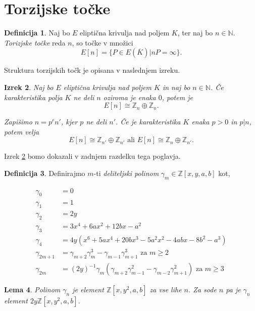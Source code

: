 \documentclass[12pt,a4paper,twoside]{article}
\theoremstyle{definition} %
\newtheorem{definicija}{Definicija}[section]
\theoremstyle{plain} %
\newtheorem{lema}[definicija]{Lema}
\newtheorem{izrek}[definicija]{Izrek}
\numberwithin{equation}{section}  %
\newcommand{\N}{\mathbb N}
\newcommand{\Z}{\mathbb Z}
\newcommand{\E}[1]{E({#1})}
\begin{document}
\section{Torzijske točke}

\begin{definicija}
Naj bo $E$ eliptična krivulja nad poljem $K$, ter naj bo $n\in \N$. \emph{Torizjske točke} reda $n$, so točke v množici
$$E[n] = \{ P \in \E{\overline{K}} | nP = \infty \}.$$
\end{definicija}

Struktura torzijskih točk je opisana v naslednjem izreku.

\begin{izrek}
\label{IzrekTor}
Naj bo $E$ eliptična krivulja nad poljem $K$ in naj bo $n \in \N$. Če karakteristika polja $K$ ne deli $n$ oziroma je enaka $0$, potem je
$$E[n] \cong \mathbb{Z}_n \oplus \mathbb{Z}_n.$$

Zapišimo $n=p^rn'$, kjer $p$ ne deli $n'$. Če je karakteristika $K$ enaka $p >0$ in $p|n$, potem velja
$$E[n] \cong \mathbb{Z}_{n'} \oplus \mathbb{Z}_{n'} \text{ ali } E[n] \cong \mathbb{Z}_n \oplus \mathbb{Z}_{n'}.$$

\end{izrek}

Izrek \ref{IzrekTor} bomo dokazali v zadnjem razdelku tega poglavja.

\begin{definicija}
Definirajmo $m$-ti \emph{deliteljski polinom} $\gamma_m \in \Z[x,y,a,b]$ kot,


\begin{align}
\gamma_0 &{}= 0  \nonumber \\
\gamma_1 &{}= 1  \nonumber \\
\gamma_2 &{}= 2y  \nonumber \\
\gamma_3 &{}= 3x^4 + 6ax^2 + 12bx-a^2 \nonumber \\
\gamma_4 &{}= 4y(x^6+5ax^4+20bx^3-5a^2x^2-4abx-8b^2-a^3) \nonumber \\
\gamma_{2m+1} &{}= \gamma_{m+2}\gamma_{m}^3-\gamma_{m-1}\gamma_{m+1}^3 \text{ za } m \geq 2 \nonumber \\
\gamma_{2m} &{}= (2y)^{-1}\gamma_{m}(\gamma_{m+2}\gamma_{m-1}^2-\gamma_{m-2}\gamma_{m+1}^2)\text{ za } m \geq 3 \nonumber
\end{align}

\end{definicija}

\begin{lema}
Polinom $\gamma_{n}$ je element $\Z[x,y^2,a,b]$ za vse lihe $n$.  Za sode $n$ pa je $\gamma_{n}$ element \newline $2y\Z[x,y^2,a,b]$.

\end{lema}
\end{document}
